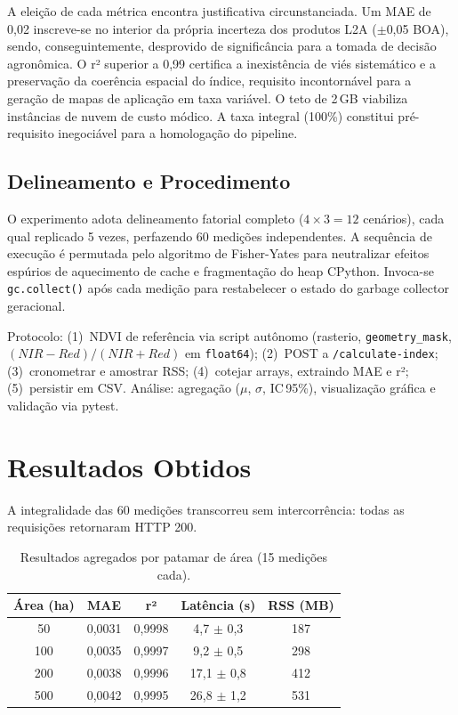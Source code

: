 \documentclass[10pt, a4paper]{article}
\begin{document}
A eleição de cada métrica encontra justificativa circunstanciada. Um MAE de 0,02 inscreve-se no interior da própria incerteza dos produtos L2A ($\pm$0,05 BOA), sendo, conseguintemente, desprovido de significância para a tomada de decisão agronômica. O r² superior a 0,99 certifica a inexistência de viés sistemático e a preservação da coerência espacial do índice, requisito incontornável para a geração de mapas de aplicação em taxa variável. O teto de 2\,GB viabiliza instâncias de nuvem de custo módico. A taxa integral (100\%) constitui pré-requisito inegociável para a homologação do pipeline.

\subsection{Delineamento e Procedimento}

O experimento adota delineamento fatorial completo ($4 \times 3 = 12$ cenários), cada qual replicado 5 vezes, perfazendo 60 medições independentes. A sequência de execução é permutada pelo algoritmo de Fisher-Yates para neutralizar efeitos espúrios de aquecimento de cache e fragmentação do heap CPython. Invoca-se \texttt{gc.collect()} após cada medição para restabelecer o estado do garbage collector geracional.

Protocolo: (1)~NDVI de referência via script autônomo (rasterio, \texttt{geometry\_mask}, $(NIR\!-\!Red)/(NIR\!+\!Red)$ em \texttt{float64}); (2)~POST a \texttt{/calculate-index}; (3)~cronometrar e amostrar RSS; (4)~cotejar arrays, extraindo MAE e r²; (5)~persistir em CSV. Análise: agregação ($\mu$, $\sigma$, IC\,95\%), visualização gráfica e validação via pytest.

\section{Resultados Obtidos}

A integralidade das 60 medições transcorreu sem intercorrência: todas as requisições retornaram HTTP 200.

\begin{table}[H]
\centering\small
\caption{Resultados agregados por patamar de área (15 medições cada).}
\label{tab:resultados}
\begin{tabularx}{\textwidth}{ccccc}
\toprule
\textbf{Área (ha)} & \textbf{MAE} & \textbf{r²} & \textbf{Latência (s)} & \textbf{RSS (MB)} \\
\midrule
50 & 0,0031 & 0,9998 & 4,7 $\pm$ 0,3 & 187 \\
100 & 0,0035 & 0,9997 & 9,2 $\pm$ 0,5 & 298 \\
200 & 0,0038 & 0,9996 & 17,1 $\pm$ 0,8 & 412 \\
500 & 0,0042 & 0,9995 & 26,8 $\pm$ 1,2 & 531 \\
\bottomrule
\end{tabularx}
\end{table}
\end{document}
